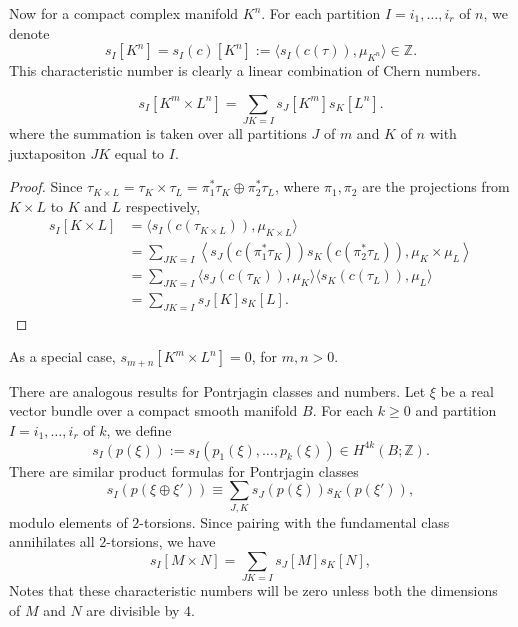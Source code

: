 Now for a compact complex manifold $K^n$. For each partition
$I=i_1,\dots,i_r$ of $n$, we denote
\begin{equation*}
    s_I[K^n] = s_I(c)[K^n] := \langle s_I(c(\tau)), \mu_{K^n}\rangle\in\mathbb{Z}.
\end{equation*}
This characteristic number is clearly a linear combination of
Chern numbers.

\begin{corollary}
    \begin{equation*}
        s_I[K^m\times L^n] =
        \sum_{JK=I} s_J[K^m] s_K[L^n].
    \end{equation*}
    where the summation is taken over all partitions $J$ of $m$ and $K$ of $n$
    with juxtapositon $JK$ equal to $I$.
\end{corollary}
\begin{proof}
    Since $\tau_{K\times L} = \tau_K \times \tau_L = \pi_1^*\tau_K \oplus \pi_2^*\tau_L$,
    where $\pi_1,\pi_2$ are the projections from $K\times L$ to
    $K$ and $L$ respectively, 
    \begin{align*}
        s_I[K\times L]
        &= \langle s_I(c(\tau_{K\times L})), \mu_{K\times L}\rangle \\
        &= \sum_{JK=I} \left\langle s_J(c(\pi_1^*\tau_K)) s_K(c(\pi_2^*\tau_L)),
        \mu_{K}\times \mu_{L} \right\rangle \\
        &= \sum_{JK=I} \langle s_J(c(\tau_K)), \mu_K \rangle
        \langle s_K(c(\tau_L)), \mu_L \rangle \\
        &= \sum_{JK=I} s_J[K] s_K[L].
    \end{align*}
\end{proof}

\begin{corollary}
    As a special case, $s_{m+n}[K^m\times L^n] = 0$, for $m,n>0$.
\end{corollary}

There are analogous results for Pontrjagin classes and numbers. 
Let $\xi$ be a real vector bundle over a compact smooth manifold $B$. 
For each $k\geq0$ and partition $I=i_1,\dots,i_r$ of $k$, we define
\begin{equation*}
    s_I(p(\xi)) := s_I(p_1(\xi),\dots,p_k(\xi))\in
    H^{4k}(B;\mathbb{Z}).
\end{equation*}
There are similar product formulas for Pontrjagin classes 
\begin{equation*}
    s_I(p(\xi\oplus\xi')) \equiv
    \sum_{J,K} s_J(p(\xi)) s_K(p(\xi')),
\end{equation*}
modulo elements of $2$-torsions. Since pairing with the fundamental class
annihilates all $2$-torsions, we have 
\begin{equation*}
    s_I[M\times N] = \sum_{JK=I} s_J[M] s_K[N],
\end{equation*}
Notes that these characteristic numbers
will be zero unless both the dimensions of $M$ and $N$ are divisible by $4$.

